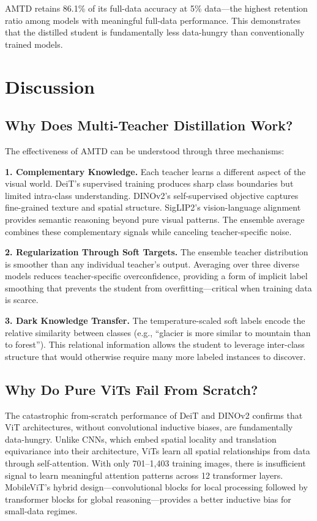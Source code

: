 \documentclass[journal]{IEEEtran}
\begin{document}
AMTD retains 86.1\% of its full-data accuracy at 5\% data---the highest retention ratio
among models with meaningful full-data performance. This demonstrates that the distilled
student is fundamentally less data-hungry than conventionally trained models.

\section{Discussion}
\label{sec:discussion}

\subsection{Why Does Multi-Teacher Distillation Work?}

The effectiveness of AMTD can be understood through three mechanisms:

\textbf{1. Complementary Knowledge.} Each teacher learns a different aspect of the visual world.
DeiT's supervised training produces sharp class boundaries but limited intra-class
understanding. DINOv2's self-supervised objective captures fine-grained texture and spatial
structure. SigLIP2's vision-language alignment provides semantic reasoning beyond pure visual
patterns. The ensemble average combines these complementary signals while canceling
teacher-specific noise.

\textbf{2. Regularization Through Soft Targets.} The ensemble teacher distribution is
smoother than any individual teacher's output. Averaging over three diverse models reduces
teacher-specific overconfidence, providing a form of implicit label smoothing
that prevents the student from overfitting---critical when training data is scarce.

\textbf{3. Dark Knowledge Transfer.} The temperature-scaled soft labels encode the relative
similarity between classes (e.g., ``glacier is more similar to mountain than to forest'').
This relational information allows the student to leverage inter-class structure that
would otherwise require many more labeled instances to discover.

\subsection{Why Do Pure ViTs Fail From Scratch?}

The catastrophic from-scratch performance of DeiT and DINOv2 confirms that ViT architectures,
without convolutional inductive biases, are fundamentally data-hungry. Unlike CNNs, which
embed spatial locality and translation equivariance into their architecture, ViTs learn
all spatial relationships from data through self-attention. With only 701--1,403 training
images, there is insufficient signal to learn meaningful attention patterns across 12
transformer layers. MobileViT's hybrid design---convolutional blocks for local processing
followed by transformer blocks for global reasoning---provides a better inductive bias for
small-data regimes.
\end{document}
